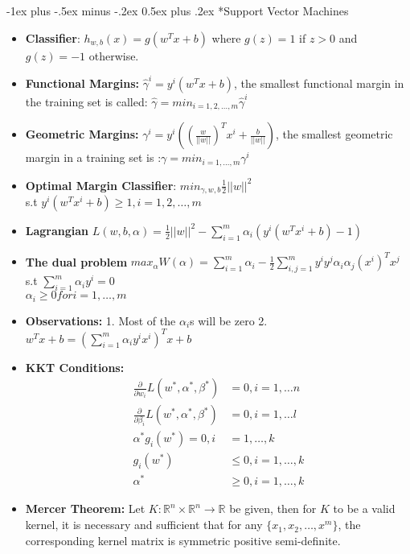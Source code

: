 \documentclass[10pt,landscape]{article}
\makeatletter
\renewcommand{\section}{\@startsection{section}{1}{0mm}%
                                {-1ex plus -.5ex minus -.2ex}%
                                {0.5ex plus .2ex}%
                                {\normalfont\large\bfseries}}
\makeatother
\begin{document}
\begin{multicols}{3}
\section*{Support Vector Machines}
\begin{itemize}
\item \textbf{Classifier}: $h_{w, b}(x) = g(w^Tx+b) $ where $g(z) = 1$ if $z >0$ and $g(z) = -1$ otherwise. 
\item \textbf{Functional Margins:} $\hat{\gamma}^i = y^i (w^Tx +b)$, the smallest functional margin in the training set is called: $\hat{\gamma} = min_{i = 1, 2, \dots, m} \hat{\gamma}^i$
\item \textbf{Geometric Margins:} $\gamma^i = y^i ((\frac{w}{||w||})^T x^i + \frac{b}{||w||})$, the smallest geometric margin in a training set is :$ \gamma = min_{i = 1, \dots, m} \gamma^i$
\item \textbf{Optimal Margin Classifier}: $min_{\gamma, w, b} \frac{1}{2} ||w||^2$\\
s.t $y^i(w^Tx^i +b) \geq 1, i = 1, 2, \dots, m$
\item \textbf{Lagrangian} $ L(w, b, \alpha) = \frac{1}{2} ||w||^2 - \sum_{i = 1}^{m}\alpha_i (y^i (w^Tx^i +b)-1)$
\item \textbf{The dual problem } $max_\alpha W(\alpha) = \sum_{i = 1}^{m}\alpha_i - \frac{1}{2}\sum_{i, j = 1}^{m}y^i y^j \alpha_i \alpha_j (x^i)^Tx^j$\\
s.t $\sum_{i = 1}^{m}\alpha_i y^i = 0$\\
$\alpha_i \geq 0 for i = 1, \dots, m$
\item \textbf{Observations:} 1. Most of the $\alpha_i$s will be zero 2. $w^Tx +b = (\sum_{i = 1}^{m} \alpha_i y^i x^i )^T x +b $
\item \textbf{KKT Conditions:}
\begin{align*}
\frac{\partial }{\partial w_i} L(w^*, \alpha^*, \beta^*) &= 0, i = 1, \dots n\\
\frac{\partial }{\partial \beta_i} L(w^*, \alpha^*, \beta^*) &= 0, i = 1, \dots l\\
\alpha^*g_i(w^*) = 0, i &= 1, \dots, k\\
g_i(w^*) &\leq 0, i = 1, \dots, k\\
\alpha^* &\geq 0, i = 1, \dots, k
\end{align*}
\item \textbf{Mercer Theorem:} Let $K: \mathbb{R}^n \times \mathbb{R}^n \rightarrow \mathbb{R}$ be given, then for $K$ to be a valid kernel, it is necessary and sufficient that for any $\{x_1, x_2, \dots, x^m\}$, the corresponding kernel matrix is symmetric positive semi-definite. 

\end{itemize}
\end{multicols}
\end{document}
